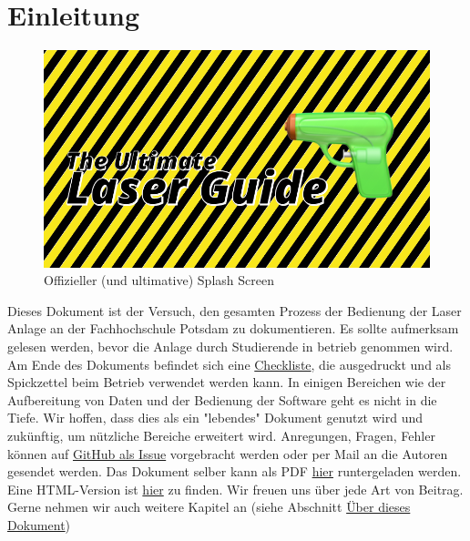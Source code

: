 \documentclass[]{article}
\date{}
\begin{document}
\RaggedRight

\newpage
{
\setcounter{tocdepth}{3}
\tableofcontents
}
\newpage
\hypertarget{einleitung}{%
\section{Einleitung}\label{einleitung}}

\begin{figure}
\hypertarget{fig:splash}{%
\centering
\includegraphics{assets/images/splash.png}
\caption{Offizieller (und ultimative) Splash Screen}\label{fig:splash}
}
\end{figure}

Dieses Dokument ist der Versuch, den gesamten Prozess der Bedienung der
Laser Anlage an der Fachhochschule Potsdam zu dokumentieren. Es sollte
aufmerksam gelesen werden, bevor die Anlage durch Studierende in betrieb
genommen wird. Am Ende des Dokuments befindet sich eine
\protect\hyperlink{checklist}{Checkliste}, die ausgedruckt und als
Spickzettel beim Betrieb verwendet werden kann. In einigen Bereichen wie
der Aufbereitung von Daten und der Bedienung der Software geht es nicht
in die Tiefe. Wir hoffen, dass dies als ein "lebendes" Dokument genutzt
wird und zukünftig, um nützliche Bereiche erweitert wird. Anregungen,
Fragen, Fehler können auf
\href{https://github.com/FH-Potsdam/the-ultimate-laser-guide/issues}{GitHub
als Issue} vorgebracht werden oder per Mail an die Autoren gesendet
werden. Das Dokument selber kann als PDF
\href{https://github.com/FH-Potsdam/the-ultimate-laser-guide/raw/master/The-Ultimate-Laser-Guide.pdf}{hier}
runtergeladen werden. Eine HTML-Version ist
\href{https://fh-potsdam.github.io/the-ultimate-laser-guide/}{hier} zu
finden. Wir freuen uns über jede Art von Beitrag. Gerne nehmen wir auch
weitere Kapitel an (siehe Abschnitt
\protect\hyperlink{uxfcber-dieses-dokument}{Über dieses Dokument})
\end{document}
